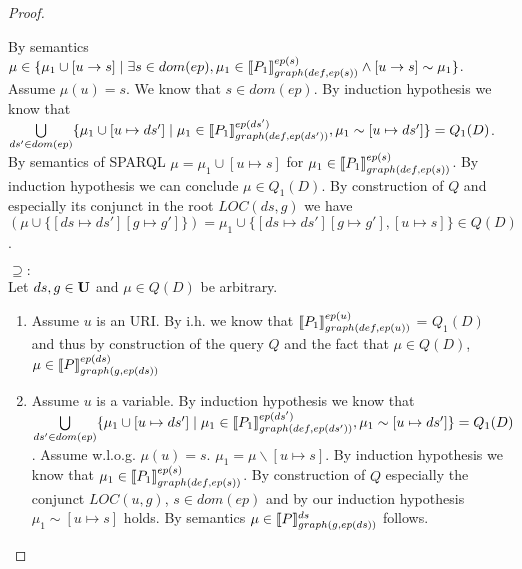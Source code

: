 \begin{proof}
\begin{enumerate}
\begin{enumerate}
					By semantics $\mu \in \{ \mu_1 \cup [u \rightarrow s ] \mid
						\exists s \in dom(ep), \mu_1 \in \llbracket P_1
						\rrbracket^{ep(s)}_{graph(def,ep(s))} \land
					[u \rightarrow s] \sim \mu_1 \}$. Assume $\mu(u) = s$. We know that $s \in dom(ep)$.
					By induction hypothesis we know that 
					$\bigcup\limits_{ds' \in dom(ep)} \{ \mu_1 \cup [u
						\mapsto ds'] \mid \mu_1 \in
						\llbracket P_1\rrbracket^{ep(ds')}_{graph(def,ep(ds'))},
					\mu_1 \sim [u\mapsto ds'] \}  = Q_1(D) $. 
					By semantics of SPARQL $\mu = \mu_1 \cup
					[u \mapsto s]$ for $\mu_1 \in \llbracket P_1\rrbracket^{ep(s)}_{graph(def,ep(s))}$. 
					By induction hypothesis we can conclude
					$\mu \in Q_1(D)$.
					By construction of $Q$ and especially its conjunct in the
					root $LOC(ds,g)$ we have 
					$(\mu \cup \{[ds \mapsto ds'][g \mapsto g']\}) =
					\mu_1 \cup \{[ds \mapsto ds'][g \mapsto g'], [u
					\mapsto s]\} \in Q(D)$. 
			\end{enumerate}



			\bigskip\noindent$\supseteq:$\\
			Let $ds,g \in \mathbf{U}$ and $\mu \in Q(D)$ be arbitrary.
			\begin{enumerate}
				\item Assume $u$ is an URI. 
					By i.h. we know that 
					$\llbracket P_1 \rrbracket^{ep(u)}_{graph(def,ep(u))}$ =
					$Q_1(D)$ and thus by construction of the query $Q$ and the
					fact that $\mu \in Q(D)$, $\mu \in \llbracket P
					\rrbracket^{ep(ds)}_{graph(g,ep(ds))}$
				\item Assume $u$ is a variable. By induction hypothesis we
					know that  $\bigcup\limits_{ds' \in dom(ep)} \{ \mu_1 \cup [u
						\mapsto ds'] \mid \mu_1 \in
						\llbracket P_1\rrbracket^{ep(ds')}_{graph(def,ep(ds'))},
					\mu_1 \sim [u\mapsto ds'] \}  = Q_1(D) $.
					Assume w.l.o.g. $\mu(u) = s$.
					$\mu_1 = \mu \backslash [u \mapsto s]$. By induction hypothesis we know
					that $\mu_1 \in \llbracket P_1 \rrbracket^{ep(s)}_{graph(def,ep(s))}$. By
					construction of $Q$ especially the conjunct $LOC(u,g)$, $s \in dom(ep)$ 
					and by our induction hypothesis $\mu_1 \sim	[u \mapsto s]$ holds.
					By semantics $\mu \in \llbracket P \rrbracket^{ds}_{graph(g,ep(ds))}$ follows.
			\end{enumerate}


\end{enumerate}
\end{proof}
